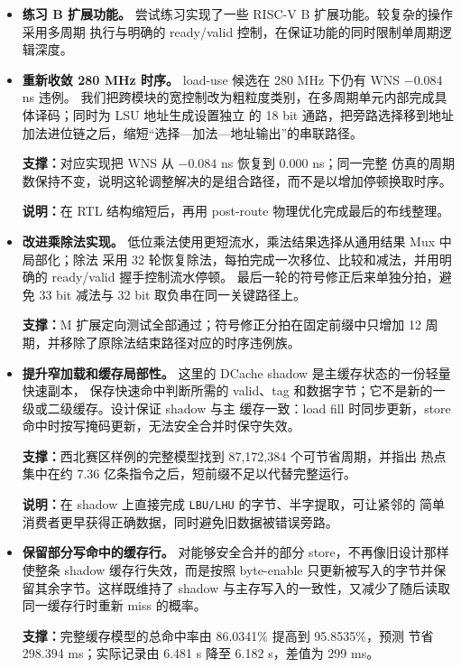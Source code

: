 \documentclass[UTF8,a4paper,12pt]{ctexart}
\newcommand{\code}[1]{\texttt{#1}}
\begin{document}
\begin{itemize}
  \item \textbf{练习 B 扩展功能。} 尝试练习实现了一些 RISC-V B 扩展功能。较复杂的操作采用多周期
  执行与明确的 ready/valid 控制，在保证功能的同时限制单周期逻辑深度。
  \item \textbf{重新收敛 280 MHz 时序。} load-use 候选在 280 MHz 下仍有 WNS $-0.084$ ns 违例。
  我们把跨模块的宽控制改为粗粒度类别，在多周期单元内部完成具体译码；同时为 LSU 地址生成设置独立
  的 18 bit 通路，把旁路选择移到地址加法进位链之后，缩短“选择—加法—地址输出”的串联路径。
  \par\noindent\textbf{支撑：}{\kaishu 对应实现把 WNS 从 $-0.084$ ns 恢复到 $0.000$ ns；同一完整
  仿真的周期数保持不变，说明这轮调整解决的是组合路径，而不是以增加停顿换取时序。}
  \par\noindent\textbf{说明：}在 RTL 结构缩短后，再用 post-route 物理优化完成最后的布线整理。
  \item \textbf{改进乘除法实现。} 低位乘法使用更短流水，乘法结果选择从通用结果 Mux 中局部化；除法
  采用 32 轮恢复除法，每拍完成一次移位、比较和减法，并用明确的 ready/valid 握手控制流水停顿。
  最后一轮的符号修正后来单独分拍，避免 33 bit 减法与 32 bit 取负串在同一关键路径上。
  \par\noindent\textbf{支撑：}{\kaishu M 扩展定向测试全部通过；符号修正分拍在固定前缀中只增加
  12 周期，并移除了原除法结束路径对应的时序违例族。}
  \item \textbf{提升窄加载和缓存局部性。} 这里的 DCache shadow 是主缓存状态的一份轻量快速副本，
  保存快速命中判断所需的 valid、tag 和数据字节；它不是新的一级或二级缓存。设计保证 shadow 与主
  缓存一致：load fill 时同步更新，store 命中时按写掩码更新，无法安全合并时保守失效。
  \par\noindent\textbf{支撑：}{\kaishu 西北赛区样例的完整模型找到 87,172,384 个可节省周期，并指出
  热点集中在约 7.36 亿条指令之后，短前缀不足以代替完整运行。}
  \par\noindent\textbf{说明：}在 shadow 上直接完成 \code{LBU/LHU} 的字节、半字提取，可让紧邻的
  简单消费者更早获得正确数据，同时避免旧数据被错误旁路。
  \item \textbf{保留部分写命中的缓存行。} 对能够安全合并的部分 store，不再像旧设计那样使整条
  shadow 缓存行失效，而是按照 byte-enable 只更新被写入的字节并保留其余字节。这样既维持了 shadow
  与主存写入的一致性，又减少了随后读取同一缓存行时重新 miss 的概率。
  \par\noindent\textbf{支撑：}{\kaishu 完整缓存模型的总命中率由 86.0341\% 提高到 95.8535\%，预测
  节省 298.394 ms；实际记录由 6.481 s 降至 6.182 s，差值为 299 ms。}

\end{itemize}
\end{document}
